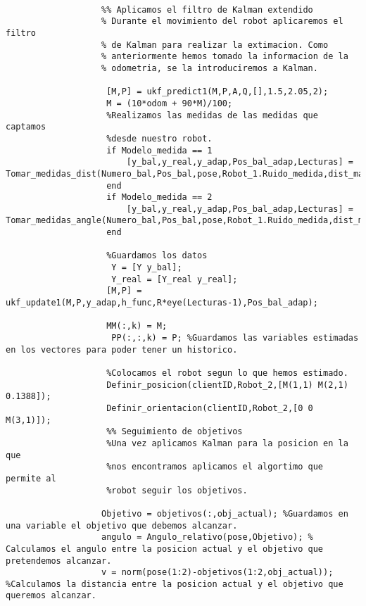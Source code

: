\begin{lstlisting}[frame=single]
                    
                   %% Aplicamos el filtro de Kalman extendido
                   % Durante el movimiento del robot aplicaremos el filtro
                   % de Kalman para realizar la extimacion. Como
                   % anteriormente hemos tomado la informacion de la
                   % odometria, se la introduciremos a Kalman.
                    
                    [M,P] = ukf_predict1(M,P,A,Q,[],1.5,2.05,2); 
                    M = (10*odom + 90*M)/100;
                    %Realizamos las medidas de las medidas que captamos
                    %desde nuestro robot.
                    if Modelo_medida == 1
                        [y_bal,y_real,y_adap,Pos_bal_adap,Lecturas] = Tomar_medidas_dist(Numero_bal,Pos_bal,pose,Robot_1.Ruido_medida,dist_max);
                    end
                    if Modelo_medida == 2
                        [y_bal,y_real,y_adap,Pos_bal_adap,Lecturas] = Tomar_medidas_angle(Numero_bal,Pos_bal,pose,Robot_1.Ruido_medida,dist_max);   
                    end
                    
                    %Guardamos los datos
                     Y = [Y y_bal];
                     Y_real = [Y_real y_real];
                    [M,P] = ukf_update1(M,P,y_adap,h_func,R*eye(Lecturas-1),Pos_bal_adap);
                    
                    MM(:,k) = M; 
                     PP(:,:,k) = P; %Guardamos las variables estimadas en los vectores para poder tener un historico.
                       
                    %Colocamos el robot segun lo que hemos estimado.
                    Definir_posicion(clientID,Robot_2,[M(1,1) M(2,1) 0.1388]);
                    Definir_orientacion(clientID,Robot_2,[0 0 M(3,1)]);
                    %% Seguimiento de objetivos
                    %Una vez aplicamos Kalman para la posicion en la que
                    %nos encontramos aplicamos el algortimo que permite al
                    %robot seguir los objetivos.
                   
                   Objetivo = objetivos(:,obj_actual); %Guardamos en una variable el objetivo que debemos alcanzar.
                   angulo = Angulo_relativo(pose,Objetivo); % Calculamos el angulo entre la posicion actual y el objetivo que pretendemos alcanzar.
                   v = norm(pose(1:2)-objetivos(1:2,obj_actual)); %Calculamos la distancia entre la posicion actual y el objetivo que queremos alcanzar.


\end{lstlisting}
